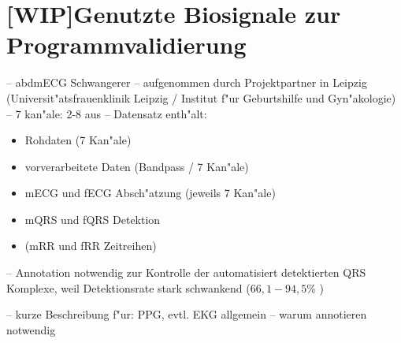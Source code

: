 
\section{[WIP]Genutzte Biosignale zur Programmvalidierung}
\label{chap:genutzte_biosignale}

-- abdmECG Schwangerer
-- aufgenommen durch Projektpartner in Leipzig (Universit"atsfrauenklinik Leipzig / Institut f"ur Geburtshilfe und Gyn"akologie)
-- 7 kan"ale: 2-8 aus \cite{Zaunseder2012}
-- Datensatz enth"alt: 
\begin{itemize}
	\item Rohdaten (7 Kan"ale)
	\item vorverarbeitete Daten (Bandpass / 7 Kan"ale)
	\item mECG und fECG Absch"atzung (jeweils 7 Kan"ale)
	\item mQRS und fQRS Detektion
	\item (mRR und fRR Zeitreihen)
\end{itemize}
-- Annotation notwendig zur Kontrolle der automatisiert detektierten QRS Komplexe, weil Detektionsrate stark schwankend ($66,1 - 94,5$\% \cite{Zaunseder2012})

-- kurze Beschreibung f"ur: \ac{PPG}, evtl. \ac{EKG} allgemein
-- warum annotieren notwendig

